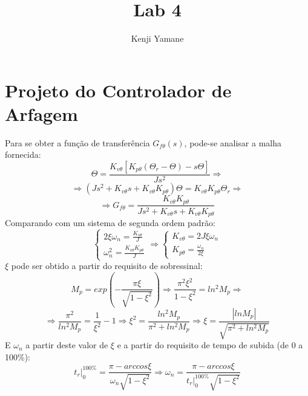 \documentclass[a4paper]{article}
\title{Lab 4}
\author{Kenji Yamane}
\begin{document}
	\maketitle
	\section{Projeto do Controlador de Arfagem}
	Para se obter a fun\c{c}\~ao de transfer\^encia $G_{f\theta}(s)$, pode-se analisar
	a malha fornecida:
	\begin{equation}
		\Theta = \frac{K_{v\theta}[K_{p\theta}(\Theta_r - \Theta) - s\Theta]}{Js^2}
		\Rightarrow
		\nonumber
	\end{equation}
	\begin{equation}
		\Rightarrow
		(Js^2 + K_{v\theta}s + K_{v\theta}K_{p\theta})\Theta = K_{v\theta}K_{p\theta}\Theta_r
		\Rightarrow
		\nonumber
	\end{equation}
	\begin{equation}
		\Rightarrow
		G_{f\theta} = \frac{K_{v\theta}K_{p\theta}}{Js^2 + K_{v\theta}s + K_{v\theta}K_{p\theta}}
		\nonumber
	\end{equation}
	Comparando com um sistema de segunda ordem padr\~ao:
	\begin{equation}
		\left\{\begin{array}{l}
			2\xi\omega_n = \frac{K_{v\theta}}{J}\\
			\omega_n^2 = \frac{K_{v\theta}K_{p\theta}}{J}
		\end{array}\right. \Rightarrow
		\left\{\begin{array}{l}
			K_{v\theta} = 2J\xi\omega_n\\
			K_{p\theta} = \frac{\omega_n}{2\xi}
		\end{array}\right.
		\nonumber
	\end{equation}
	$\xi$ pode ser obtido a partir do requisito de sobressinal:
	\begin{equation}
		M_p = exp\left(-\frac{\pi\xi}{\sqrt{1 - \xi^2}}\right) \Rightarrow
		\frac{\pi^2\xi^2}{1 - \xi^2} = ln^2M_p \Rightarrow
		\nonumber
	\end{equation}
	\begin{equation}
	 	\Rightarrow \frac{\pi^2}{ln^2M_p} = \frac{1}{\xi^2} - 1 \Rightarrow
		\xi^2 = \frac{ln^2M_p}{\pi^2 + ln^2M_p} \Rightarrow
		\xi = \frac{|lnM_p|}{\sqrt{\pi^2 + ln^2M_p}}
		\label{eq:xi}
	\end{equation}
	E $\omega_n$ a partir deste valor de $\xi$ e a partir do requisito de tempo de subida
	(de 0 a 100\%):
	\begin{equation}
		t_r\big|_0^{100\%} = \frac{\pi - arccos\xi}{\omega_n\sqrt{1 - \xi^2}} \Rightarrow
		\omega_n = \frac{\pi - arccos\xi}{t_r\big|_0^{100\%}\sqrt{1 - \xi^2}}
		\label{eq:omega_n}
	\end{equation}
\end{document}
